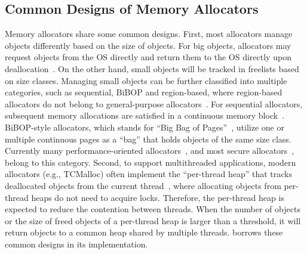 
\subsection{Common Designs of Memory Allocators}
\label{sec:commondesign}

Memory allocators share some common designs. First, most allocators manage objects differently based on the size of objects. For big objects, allocators may request objects from the OS directly and return them to the OS directly upon deallocation~\cite{Hoard}. On the other hand, small objects will be tracked in freelists based on size classes. Managing small objects can be further classified into multiple categories, such as sequential, BiBOP and region-based, where region-based allocators do not belong to general-purpose allocators~\cite{DieHarder, Gay:1998:MME:277650.277748}.
For sequential allocators, subsequent memory allocations are satisfied in a continuous memory block~\cite{Cling}. BiBOP-style allocators, which stands for ``Big Bag of Pages''~\cite{hanson1980portable}, utilize one or multiple continuous pages as a ``bag'' that holds objects of the same size class. 
Currently many performance-oriented allocators~\cite{tcmalloc, jemalloc, Scalloc}, and most secure allocators~\cite{openbsd, DieHarder, FreeGuard, Guarder}, belong to this category. Second, to support multithreaded applications, modern allocators (e.g., TCMalloc) often implement the ``per-thread heap'' that tracks deallocated objects from the current thread~\cite{tcmallocnuma}, where allocating objects from per-thread heaps do not need to acquire locks. Therefore, the per-thread heap is expected to reduce the contention between threads. When the number of objects or the size of freed objects of a per-thread heap is larger than a threshold, it will return objects to a common heap shared by multiple threads. \NM{} borrows these common designs in its implementation. 

 